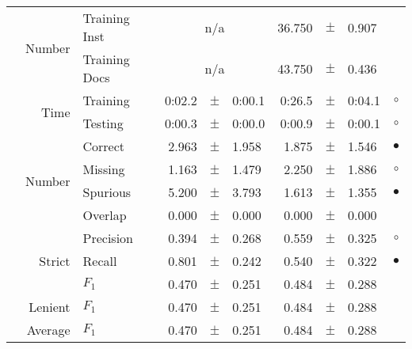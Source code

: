 \begin{longtable}{|r|r|l||rcl|rcl|c|}
\cline{2-10} & \multirow{2}{*}{    Number} &   Training Inst &    \multicolumn{3}{c|}{n/a}         &      36.750 &  $\pm$  &       0.907 &  \\
\cline{3-10} &                             &   Training Docs &    \multicolumn{3}{c|}{n/a}         &      43.750 &  $\pm$  &       0.436 &  \\
\cline{2-10} & \multirow{2}{*}{      Time} &        Training &      0:02.2 &  $\pm$  &      0:00.1 &      0:26.5 &  $\pm$  &      0:04.1 & $\circ$ \\
\cline{3-10} &                             &         Testing &      0:00.3 &  $\pm$  &      0:00.0 &      0:00.9 &  $\pm$  &      0:00.1 & $\circ$ \\
\hline
\pagebreak[4]
\hline
\hline
\multirow{11}{*}{\begin{sideways}injuries\end{sideways} }
             & \multirow{4}{*}{    Number} &         Correct &       2.963 &  $\pm$  &       1.958 &       1.875 &  $\pm$  &       1.546 & $\bullet$ \\
\cline{3-10} &                             &         Missing &       1.163 &  $\pm$  &       1.479 &       2.250 &  $\pm$  &       1.886 & $\circ$ \\
\cline{3-10} &                             &        Spurious &       5.200 &  $\pm$  &       3.793 &       1.613 &  $\pm$  &       1.355 & $\bullet$ \\
\cline{3-10} &                             &         Overlap &       0.000 &  $\pm$  &       0.000 &       0.000 &  $\pm$  &       0.000 &  \\
\cline{2-10} & \multirow{3}{*}{    Strict} &       Precision &       0.394 &  $\pm$  &       0.268 &       0.559 &  $\pm$  &       0.325 & $\circ$ \\
\cline{3-10} &                             &          Recall &       0.801 &  $\pm$  &       0.242 &       0.540 &  $\pm$  &       0.322 & $\bullet$ \\
\cline{3-10} &                             &           $F_1$ &       0.470 &  $\pm$  &       0.251 &       0.484 &  $\pm$  &       0.288 &  \\
\cline{2-10} &                     Lenient &           $F_1$ &       0.470 &  $\pm$  &       0.251 &       0.484 &  $\pm$  &       0.288 &  \\
\cline{2-10} &                     Average &           $F_1$ &       0.470 &  $\pm$  &       0.251 &       0.484 &  $\pm$  &       0.288 &  \\

\end{longtable}
